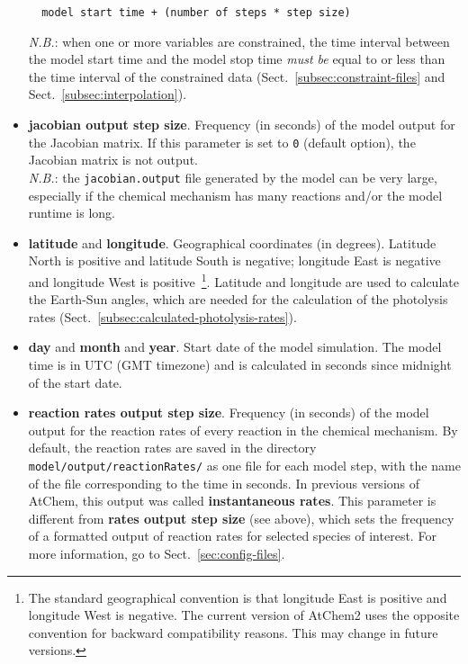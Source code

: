 \begin{itemize}
\begin{verbatim}
  model start time + (number of steps * step size)
  \end{verbatim}
  \textit{N.B.}: when one or more variables are constrained, the time
  interval between the model start time and the model stop time
  \emph{must be} equal to or less than the time interval of the
  constrained data (Sect.~\ref{subsec:constraint-files} and
  Sect.~\ref{subsec:interpolation}).
\item \textbf{jacobian output step size}. Frequency (in seconds) of
  the model output for the Jacobian matrix. If this parameter is set
  to \texttt{0} (default option), the Jacobian matrix is not
  output.\\
  \textit{N.B.}: the \texttt{jacobian.output} file generated by the
  model can be very large, especially if the chemical mechanism has
  many reactions and/or the model runtime is long.
\item \textbf{latitude} and \textbf{longitude}. Geographical
  coordinates (in degrees). Latitude North is positive and latitude
  South is negative; longitude East is negative and longitude West is
  positive~\footnote{The standard geographical convention is that
    longitude East is positive and longitude West is negative. The
    current version of AtChem2 uses the opposite convention for
    backward compatibility reasons. This may change in future
    versions.}. Latitude and longitude are used to calculate the
  Earth-Sun angles, which are needed for the calculation of the
  photolysis rates (Sect.~\ref{subsec:calculated-photolysis-rates}).
\item \textbf{day} and \textbf{month} and \textbf{year}. Start date of
  the model simulation. The model time is in UTC (GMT timezone) and is
  calculated in seconds since midnight of the start date.
\item \textbf{reaction rates output step size}. Frequency (in seconds)
  of the model output for the reaction rates of every reaction in the
  chemical mechanism. By default, the reaction rates are saved in the
  directory \texttt{model/output/reactionRates/} as one file for each
  model step, with the name of the file corresponding to the time in
  seconds. In previous versions of AtChem, this output was called
  \textbf{instantaneous rates}. This parameter is different from
  \textbf{rates output step size} (see above), which sets the
  frequency of a formatted output of reaction rates for selected
  species of interest. For more information, go to
  Sect.~\ref{sec:config-files}.
\end{itemize}

